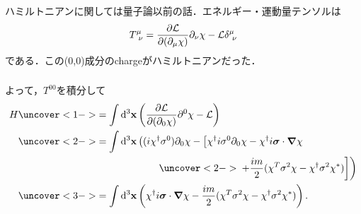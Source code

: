 \documentclass[pdflatex,unicode,ja=standard,12pt]{beamer}
\begin{document}
\begin{frame}  
  \frametitle{\subsecname}

  ハミルトニアンに関しては量子論以前の話．エネルギー・運動量テンソルは
  \begin{equation}
    T^{\mu}_{\ \nu}
    =
    \pdv{\mathcal{L}}{(\partial_\mu \chi)}\partial_\nu \chi
    -
    \mathcal{L}\delta^{\mu}_{\ \nu}
  \end{equation}
  である．この(0,0)成分のchargeがハミルトニアンだった．

\end{frame}


\begin{frame}%

  \frametitle{\subsecname}

  よって，$T^{00}$を積分して
  \begin{align}
    H
    &
    \uncover<1->{
      =
      \int\dd^3\mathbf{x}\left(  
        \pdv{\mathcal{L}}{(\partial_0 \chi)}\partial^0 \chi
        -
        \mathcal{L}
      \right)
    }
    \nonumber
    \\
    &
    \uncover<2->{
      =
      \int\dd^3 \mathbf{x}
      \left(  
        (i\chi^{\dag}\sigma^0)\partial_0\chi
        -
        \left[  
          \chi^{\dag}i\sigma^0\partial_0\chi
          -
          \chi^{\dag}i\bm{\sigma}\cdot\bm{\nabla}\chi
      \right.\right.
    }
    \nonumber
    \\
    &\hspace{5cm}
    \uncover<2->{
      \left.\left.
          +
          \frac{im}{2}(\chi^{T}\sigma^{2}\chi-\chi^{\dag}\sigma^2\chi^{*})
        \right]
      \right)
    }
    \nonumber
    \\
    &
    \uncover<3->{
      =
      \int\dd^3\mathbf{x}
      \left(  
        \chi^{\dag}i\bm{\sigma}\cdot\bm{\nabla}\chi
        -
        \frac{im}{2}(\chi^{T}\sigma^{2}\chi-\chi^{\dag}\sigma^2\chi^{*})
      \right)
      .
    }
    \label{hamiltonian}
  \end{align}

\end{frame}
\end{document}
